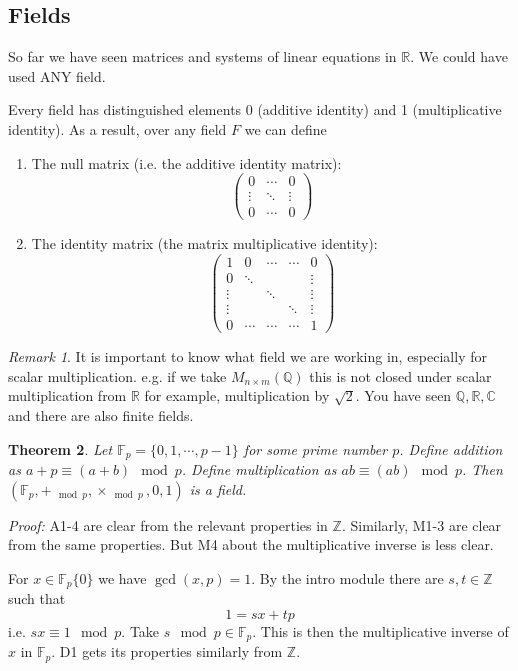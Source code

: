 \documentclass{report}
\newtheorem{theorem}{Theorem}[subsection]
\theoremstyle{remark}
\newtheorem{remark}[theorem]{Remark}
\theoremstyle{definition}
\theoremstyle{definition}
\theoremstyle{theorem}
\begin{document}
\subsection{Fields}
So far we have seen matrices and systems of linear equations in $\mathbb{R}$. We could have used ANY field. \par Every field has distinguished elements 0 (additive identity) and 1 (multiplicative identity). As a result, over any field $F$ we can define
\begin{enumerate}
    \item The null matrix (i.e. the additive identity matrix): 
    \[ \begin{pmatrix} 0 & \cdots & 0 \\
    \vdots & \ddots & \vdots\\
    0 & \cdots & 0 \end{pmatrix} \]
    \item The identity matrix (the matrix multiplicative identity):
    \[ \begin{pmatrix}
    1&0&\cdots&\cdots&0\\
    0&\ddots&&&\vdots\\
    \vdots &&\ddots&&\vdots\\
    \vdots&&&\ddots&\vdots\\
    0 & \cdots & \cdots & \cdots & 1
    \end{pmatrix} \]
\end{enumerate}
\begin{remark}
It is important to know what field we are working in, especially for scalar multiplication. e.g. if we take $M_{n \times m}(\mathbb{Q})$ this is not closed under scalar multiplication from $\mathbb{R}$ for example, multiplication by $\sqrt{2}$. You have seen $\mathbb{Q}, \mathbb{R}, \mathbb{C}$ and there are also finite fields.
\end{remark}
\begin{theorem}
Let $\mathbb{F}_p = \{0,1,\cdots,p-1\}$ for some prime number $p$. Define addition as $a + p \equiv (a+b) \mod p$. Define multiplication as $ab \equiv (ab) \mod p$. Then $(\mathbb{F}_p, +_{\mod p}, \times_{\mod p}, 0, 1)$ is a field.
\end{theorem}
\emph{Proof:} A1-4 are clear from the relevant properties in $\mathbb{Z}$. Similarly, M1-3 are clear from the same properties. But M4 about the multiplicative inverse is less clear. \par For $x \in \mathbb{F}_p  \{0\}$ we have $\gcd(x,p) = 1$. By the intro module there are $s,t \in \mathbb{Z}$ such that
\[1 = sx + tp \]
i.e. $sx \equiv 1 \mod p$. Take $s \mod p \in \mathbb{F}_p$. This is then the multiplicative inverse of $x$ in $\mathbb{F}_p$. D1 gets its properties similarly from $\mathbb{Z}$.
\end{document}
